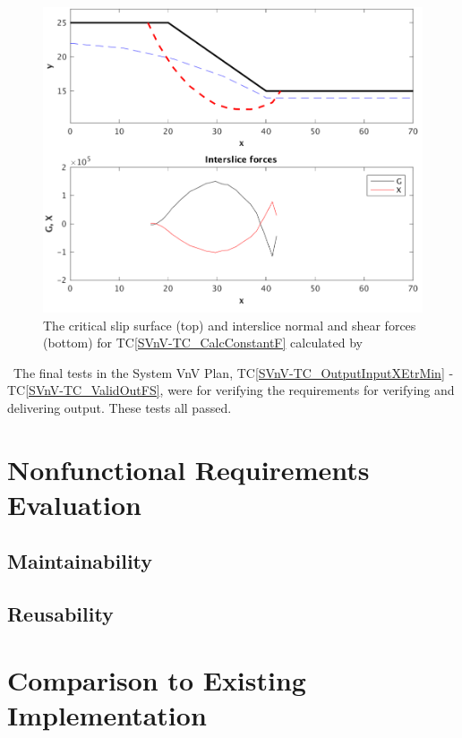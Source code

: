 \documentclass[12pt, titlepage]{article}
\newcommand{\tcref}[1]{TC\ref{#1}}
\begin{document}
\begin{figure}[h!]
	\begin{center}
		\includegraphics[width=1.0\textwidth]{ConstFPlots.png}
		\caption{The critical slip surface (top) and interslice normal and 
		shear forces (bottom) for  \tcref{SVnV-TC_CalcConstantF} calculated by 
		\progname{}}
		\label{Fig:ConstF}
	\end{center}
\end{figure}

~\newline \noindent The final tests in the System VnV Plan, 
\tcref{SVnV-TC_OutputInputXEtrMin} - \tcref{SVnV-TC_ValidOutFS}, were for 
verifying the requirements for verifying and delivering output. These tests all 
passed.

\section{Nonfunctional Requirements Evaluation} \label{sec_NonFuncReqEval}

\subsection{Maintainability}
		
\subsection{Reusability}
	
\section{Comparison to Existing Implementation} \label{sec_Comparison}
\end{document}
